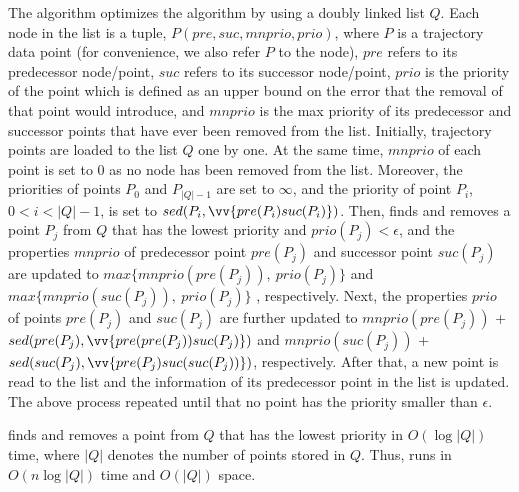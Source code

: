 The \squishe algorithm optimizes the \tpa algorithm by using a doubly linked list $Q$. Each node in the list is a tuple, \ie $P(pre, suc, mnprio, prio)$, where $P$ is a trajectory data point (for convenience, we also refer $P$ to the node), $pre$ refers to its predecessor node/point, $suc$ refers to its successor node/point, $prio$ is the priority of the point which is defined as an upper bound on the \sed error that the removal of that point would introduce, and $mnprio$ is the max priority of its predecessor and successor points that have ever been removed from the list.
%
Initially, trajectory points are loaded to the list $Q$ one by one.
At the same time, $mnprio$ of each point is set to $0$ as no node has been removed from the list.
Moreover, the priorities of points $P_0$ and $P_{|Q|-1}$ are set to $\infty$, and the priority of point $P_i$, $0<i<|Q|-1$, is set to $sed(P_i, \vv{pre(P_{i})suc(P_{i})})$.
%
Then, \squishe finds and removes a point $P_j$ from $Q$ that has the lowest priority and $prio(P_j)<\epsilon$, and the properties $mnprio$ of predecessor point $pre(P_j)$ and successor point $suc(P_j)$ are updated to $max\{mnprio(pre(P_j)), ~prio(P_j)\}$ and $max\{mnprio(suc(P_j)), ~prio(P_j)\}$ , respectively.
Next, the properties $prio$ of points $pre(P_j)$ and $suc(P_j)$ are further updated to $mnprio(pre(P_j))$ + $sed(pre(P_j), \vv{pre(pre(P_{j}))suc(P_{j})})$ and $mnprio(suc(P_j))$ + $sed(suc(P_j),\vv{pre(P_{j})suc(suc(P_{j}))})$, respectively.
%
After that, a new point is read to the list and the information of its predecessor point in the list is updated.
%
The above process repeated until that no point has the priority smaller than $\epsilon$. %

\squishe finds and removes a point from $Q$ that has the lowest priority in $O(\log |Q|)$ time, where $|Q|$ denotes the number of points stored in $Q$.
Thus, \squishe runs in $O(n\log |Q|)$ time and $O(|Q|)$ space. 

